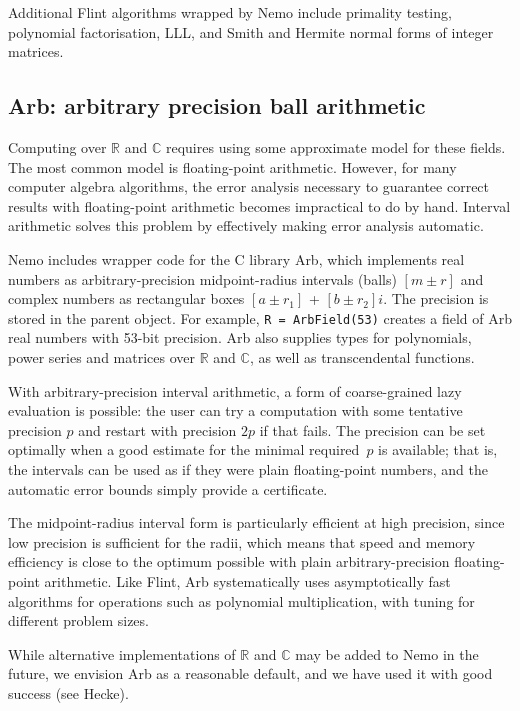 \documentclass{sig-alternate-05-2015}
\begin{document}
Additional Flint algorithms wrapped by Nemo include
primality testing, polynomial factorisation, LLL, and Smith and Hermite
normal forms of integer matrices.

\subsection{Arb: arbitrary precision ball arithmetic}

Computing over $\mathbb{R}$ and $\mathbb{C}$ requires
using some approximate model for these fields.
The most common model is floating-point arithmetic.
However, for many computer algebra algorithms, the error analysis
necessary to guarantee correct results with floating-point arithmetic
becomes impractical to do by hand.
Interval arithmetic solves this problem by effectively making
error analysis automatic.

Nemo includes wrapper code for the C library Arb, which implements real numbers as
arbitrary-precision midpoint-radius intervals (balls) $[m \pm r]$
and complex numbers as rectangular boxes $[a \pm r_1]$ + $[b \pm r_2] i$.
The precision is stored in the parent object.
For example, \texttt{R = ArbField(53)}
creates a field of Arb real numbers with 53-bit precision.
Arb also supplies types for polynomials, power series and matrices
over $\mathbb{R}$ and $\mathbb{C}$, as well as transcendental functions.

With arbitrary-precision interval arithmetic, a form of
coarse-grained lazy evaluation is possible: the user can
try a computation with some tentative precision $p$ and restart
with precision $2p$ if that fails. The precision can be set
optimally when a good estimate for the minimal
required~$p$ is available; that is, the intervals
can be used as if they were plain floating-point numbers, and the automatic
error bounds simply provide a certificate.

The midpoint-radius interval form is particularly efficient
at high precision,
since low precision is sufficient for the radii, which means that
speed and memory efficiency is close to the optimum possible
with plain arbitrary-precision floating-point arithmetic.
Like Flint, Arb systematically uses asymptotically fast algorithms
for operations such as polynomial multiplication, with tuning
for different problem sizes.

While alternative implementations of $\mathbb{R}$ and $\mathbb{C}$
may be added to Nemo in the future, we envision Arb as a reasonable default,
and we have used it with good success (see Hecke).
\end{document}
